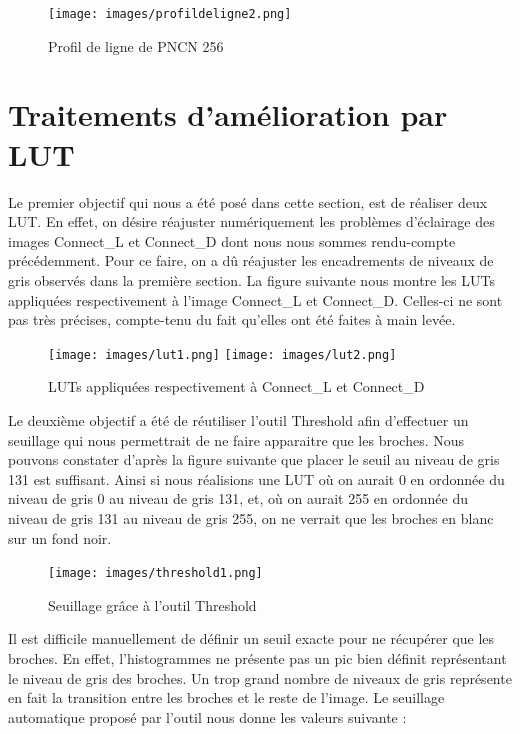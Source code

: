 \documentclass{scrreprt}
\begin{document}
\begin{figure}[!h]
\centering
\texttt{[image: images/profildeligne2.png]}
\caption{Profil de ligne de PNCN 256}
\end{figure}

\newpage
\section{Traitements d'amélioration par LUT}

Le premier objectif qui nous a été posé dans cette section, est de réaliser deux LUT. 
En effet, on désire réajuster numériquement les problèmes d'éclairage des images 
Connect_L et Connect_D dont nous nous sommes rendu-compte précédemment. 
Pour ce faire, on a dû réajuster les encadrements de niveaux de gris observés dans la
première section. La figure suivante nous montre les LUTs appliquées respectivement à 
l'image Connect_L et Connect_D. Celles-ci ne sont pas très précises, compte-tenu du 
fait qu'elles ont été faites à main levée.  

\begin{figure}[H]
\centering
\texttt{[image: images/lut1.png]} \hfill
\texttt{[image: images/lut2.png]}
\caption{LUTs appliquées respectivement à Connect_L et Connect_D}
\end{figure}

Le deuxième objectif a été de réutiliser l'outil Threshold afin d'effectuer un seuillage
qui nous permettrait de ne faire apparaitre que les broches. Nous pouvons constater d'après la figure
suivante que placer le seuil au niveau de gris 131 est suffisant. Ainsi si nous réalisions une LUT
où on aurait 0 en ordonnée du niveau de gris 0 au niveau de gris 131, et, où on aurait 255 en 
ordonnée du niveau de gris 131 au niveau de gris 255, on ne verrait que les broches en blanc sur
un fond noir.  

\begin{figure}[H]
\centering
\texttt{[image: images/threshold1.png]}
\caption{Seuillage grâce à l'outil Threshold}
\end{figure}

\newpage
Il est difficile manuellement de définir un seuil exacte pour ne récupérer que les broches.
En effet, l'histogrammes ne présente pas un pic bien définit représentant le niveau de gris 
des broches. Un trop grand nombre de niveaux de gris représente en fait la transition entre
les broches et le reste de l'image. Le seuillage automatique proposé par l'outil nous donne 
les valeurs suivante : 
\end{document}
